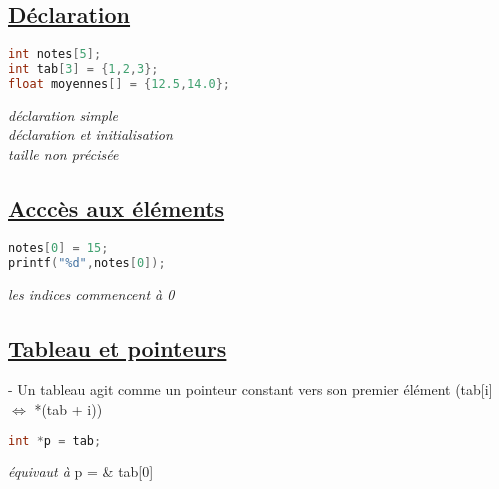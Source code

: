 \documentclass[a3paper,12pt]{article}
\begin{document}
\begin{minipage}[t]{0.5\textwidth}
\begin{tcolorbox}[title=Tableaux, fonttitle=\large, top=5pt, bottom=0pt, boxsep=1pt, colback=white,
  colframe=blue!40!black!50, 
  colbacktitle=blue!40!black!50,
  coltitle=white]
  \subsection*{{\small \underline{Déclaration}}}
  \vspace{-1.25em}
  \noindent
\begin{minipage}[t]{0.5\textwidth} 
  \begin{lstlisting}[language=C, basicstyle=\normalsize, aboveskip=0pt, belowskip=0pt]
int notes[5];
int tab[3] = {1,2,3};
float moyennes[] = {12.5,14.0};
  \end{lstlisting}
  \end{minipage}%
\hspace{4em}
\begin{minipage}[t]{0.45\textwidth}
\vspace{0.15em}
\textit{déclaration simple}\\
\textit{déclaration et initialisation}\\
\textit{taille non précisée}
\end{minipage}
  \vspace{-1.25em}
\subsection*{{\small \underline{Acccès aux éléments}}}
\vspace{-1.25em}
\noindent
\begin{minipage}[t]{0.5\textwidth} 
\begin{lstlisting}[language=C, basicstyle=\normalsize, aboveskip=0pt, belowskip=0pt]
notes[0] = 15;
printf("%d",notes[0]);
\end{lstlisting}
\end{minipage}%
\hspace{4em}
\begin{minipage}[t]{0.45\textwidth}
\vspace{0.15em}
\textit{les indices commencent à 0}
\end{minipage}
\vspace{-1.25em}
\subsection*{{\small \underline{Tableau et pointeurs}}}
- Un tableau agit comme un pointeur constant vers son premier élément (tab[i] $\Leftrightarrow$ *(tab + i))\\
\noindent
\begin{minipage}[t]{0.5\textwidth} 
\begin{lstlisting}[language=C, basicstyle=\normalsize, aboveskip=-4pt, belowskip=0pt]
int *p = tab;
\end{lstlisting}
\end{minipage}%
\hspace{4em}
\begin{minipage}[t]{0.45\textwidth}
\vspace{-2pt}
\textit{équivaut à }p = \& tab[0]
\end{minipage}


\end{tcolorbox}
\end{minipage}
\end{document}
